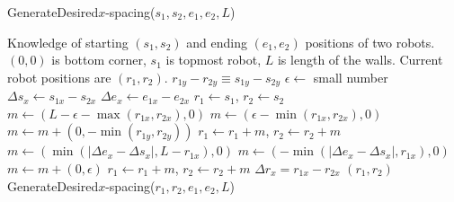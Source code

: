 \begin{algorithm}
\caption{GenerateDesired$x$-spacing($s_1,s_2,e_1,e_2,L$)}\label{alg:XControl}
\begin{algorithmic}[1]
\Require Knowledge of starting $(s_1,s_2)$ and ending $(e_1,e_2)$ positions of  two robots. 
$(0,0)$ is bottom corner, $s_1$ is topmost robot, 
 $L$ is length of the walls. Current robot positions are $(r_1,r_2)$.
\Ensure   $ r_{1y} - r_{2y}  \equiv s_{1y} - s_{2y} $   %
\State $\epsilon \gets $ small number
\State $ \Delta s_x  \gets s_{1x} - s_{2x} $
\State $ \Delta e_x \gets e_{1x} - e_{2x} $
\State $ r_1 \gets s_1$, $ r_2 \gets s_2$
\State $ m \gets ( L-\epsilon-\max( r_{1x},r_{2x}) ,0)   $ 
\Else 
\State  $ m \gets ( \epsilon-\min( r_{1x},r_{2x}),0 )    $ 
\EndIf
\State $m  \gets  m + (0, -\min( r_{1y},r_{2y} ))$ 
\State $ r_1 \gets r_1+m$, $ r_2 \gets r_2+m$ 
\State $ m \gets (\min(|\Delta e_x - \Delta s_x |, L- r_{1x}), 0)$  
\Else
\State $ m \gets (-\min(|\Delta e_x - \Delta s_x |, r_{1x}), 0)$
\EndIf 
\State $m  \gets  m + (0, \epsilon)$ 
\State $ r_1 \gets r_1+m$, $ r_2 \gets r_2+m$ 
\State $\Delta r_x = r_{1x} - r_{2x}$
\State  \Return $(r_1,r_2)$
\Else   
\State \Return GenerateDesired$x$-spacing($r_1,r_2,e_1,e_2,L$)
\EndIf
\end{algorithmic}
\end{algorithm}

